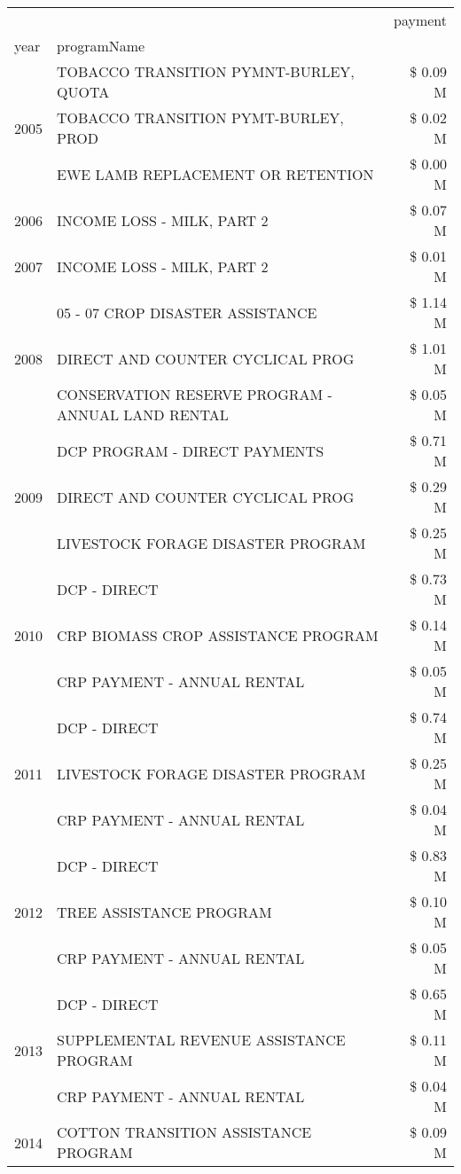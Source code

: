 \begin{tabular}{llr}
\toprule
 &  & payment \\
year & programName &  \\
\midrule
\multirow[t]{3}{*}{2005} & TOBACCO TRANSITION PYMNT-BURLEY, QUOTA & \$ 0.09 M \\
 & TOBACCO TRANSITION PYMT-BURLEY, PROD & \$ 0.02 M \\
 & EWE LAMB REPLACEMENT OR RETENTION & \$ 0.00 M \\
\cline{1-3}
2006 & INCOME LOSS - MILK, PART 2 & \$ 0.07 M \\
\cline{1-3}
2007 & INCOME LOSS - MILK, PART 2 & \$ 0.01 M \\
\cline{1-3}
\multirow[t]{3}{*}{2008} & 05 - 07 CROP DISASTER ASSISTANCE & \$ 1.14 M \\
 & DIRECT AND COUNTER CYCLICAL PROG & \$ 1.01 M \\
 & CONSERVATION RESERVE PROGRAM - ANNUAL LAND RENTAL & \$ 0.05 M \\
\cline{1-3}
\multirow[t]{3}{*}{2009} & DCP PROGRAM - DIRECT PAYMENTS & \$ 0.71 M \\
 & DIRECT AND COUNTER CYCLICAL PROG & \$ 0.29 M \\
 & LIVESTOCK FORAGE DISASTER  PROGRAM & \$ 0.25 M \\
\cline{1-3}
\multirow[t]{3}{*}{2010} & DCP - DIRECT & \$ 0.73 M \\
 & CRP BIOMASS CROP ASSISTANCE PROGRAM & \$ 0.14 M \\
 & CRP PAYMENT - ANNUAL RENTAL & \$ 0.05 M \\
\cline{1-3}
\multirow[t]{3}{*}{2011} & DCP - DIRECT & \$ 0.74 M \\
 & LIVESTOCK FORAGE DISASTER PROGRAM & \$ 0.25 M \\
 & CRP PAYMENT - ANNUAL RENTAL & \$ 0.04 M \\
\cline{1-3}
\multirow[t]{3}{*}{2012} & DCP - DIRECT & \$ 0.83 M \\
 & TREE ASSISTANCE PROGRAM & \$ 0.10 M \\
 & CRP PAYMENT - ANNUAL RENTAL & \$ 0.05 M \\
\cline{1-3}
\multirow[t]{3}{*}{2013} & DCP - DIRECT & \$ 0.65 M \\
 & SUPPLEMENTAL REVENUE ASSISTANCE PROGRAM & \$ 0.11 M \\
 & CRP PAYMENT - ANNUAL RENTAL & \$ 0.04 M \\
\cline{1-3}
\multirow[t]{3}{*}{2014} & COTTON TRANSITION ASSISTANCE PROGRAM & \$ 0.09 M \\

\end{tabular}
